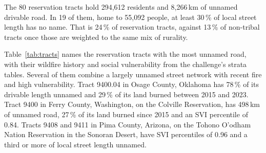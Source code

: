 \documentclass[11pt]{article}
\begin{document}
The 80 reservation tracts hold 294,612 residents and 8,266\,km of unnamed
drivable road. In 19 of them, home to 55,092 people, at least 30\,\% of local
street length has no name. That is 24\,\% of reservation tracts, against
13\,\% of non-tribal tracts once those are weighted to the same mix of
rurality.

Table~\ref{tab:tracts} names the reservation tracts with the most unnamed
road, with their wildfire history and social vulnerability from the
challenge's strata tables. Several of them combine a largely unnamed street
network with recent fire and high vulnerability. Tract 9400.04 in Osage
County, Oklahoma has 78\,\% of its drivable length unnamed and 29\,\% of its
land burned between 2015 and 2023. Tract 9400 in Ferry County, Washington,
on the Colville Reservation, has 498\,km of unnamed road, 27\,\% of its land
burned since 2015 and an SVI percentile of 0.84. Tracts 9408 and 9411 in
Pima County, Arizona, on the Tohono O'odham Nation Reservation in the
Sonoran Desert, have SVI percentiles of 0.96 and a third or more of local
street length unnamed.

\begin{table}[htbp]
\centering
\small
\caption{Reservation tracts with the most unnamed drivable road. Local:
unnamed share of local street length. Burned: share of land burned
2015 to 2023 (MTBS). SVI: CDC SVI 2022 overall percentile.}
\label{tab:tracts}
\end{table}
\end{document}
